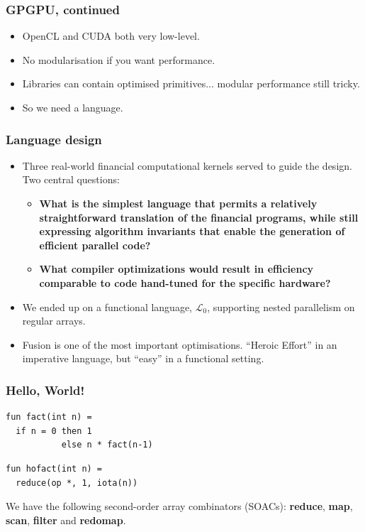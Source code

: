 \documentclass{beamer}
\newcommand{\LO}{$\mathcal{L}_0$}
\begin{document}
\begin{frame}
  \frametitle{GPGPU, continued}

  \begin{itemize}
  \item OpenCL and CUDA both very low-level.
  \item No modularisation if you want performance.
  \item Libraries can contain optimised primitives... modular
    performance still tricky.
  \item So we need a language.
  \end{itemize}
\end{frame}

\begin{frame}
  \frametitle{Language design}

  \begin{itemize}
  \item Three real-world financial computational kernels served to
    guide the design.  Two central questions:
    \begin{itemize}
    \item \textbf{What is the simplest language that permits a
        relatively straightforward translation of the financial
        programs, while still expressing algorithm invariants that
        enable the generation of efficient parallel code?}
    \item \textbf{What compiler optimizations would result in efficiency
        comparable to code hand-tuned for the specific hardware?}
    \end{itemize}
  \item We ended up on a functional language, \LO{}, supporting nested
    parallelism on regular arrays.
  \item Fusion is one of the most important optimisations.  ``Heroic
    Effort'' in an imperative language, but ``easy'' in a functional
    setting.
  \end{itemize}
\end{frame}

\begin{frame}[fragile]
  \frametitle{Hello, World!}

  \begin{lstlisting}
fun fact(int n) =
  if n = 0 then 1
           else n * fact(n-1)
\end{lstlisting}

\begin{lstlisting}
fun hofact(int n) =
  reduce(op *, 1, iota(n))
\end{lstlisting}

We have the following second-order array combinators (SOACs):
\textbf{reduce}, \textbf{map}, \textbf{scan}, \textbf{filter} and
\textbf{redomap}.

\end{frame}
\end{document}
